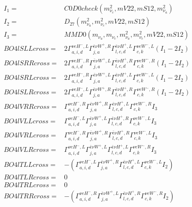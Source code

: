 \documentclass[A4,landscape]{article}
\begin{document}
\begin{align} 
I_1 = & C0D0check(m^2_{\nu_{{c}}}, mV22, mS12, m^2_{\nu_{{a}}}) \\ 
I_2 = & D_{27}(m^2_{\nu_{{a}}}, m^2_{\nu_{{c}}}, mV22, mS12) \\ 
I_3 = & MMD0(m_{\nu_{{a}}}, m_{\nu_{{c}}}, m^2_{\nu_{{a}}}, m^2_{\nu_{{c}}}, mV22, mS12) \\ 
  BO4lSLLcross= & 2  \Gamma^{\nu e H^- ,L}_{a, i, d} \Gamma^{\bar{e}\nu W^+ ,R}_{j, a} \Gamma^{\bar{e}\nu H^+,L}_{l, c, d} \Gamma^{\nu e W^-,L}_{c, k} (I_1 - 2 I_2) \\ 
  BO4lSRRcross= & 2  \Gamma^{\nu e H^- ,R}_{a, i, d} \Gamma^{\bar{e}\nu W^+ ,L}_{j, a} \Gamma^{\bar{e}\nu H^+,R}_{l, c, d} \Gamma^{\nu e W^-,R}_{c, k} (I_1 - 2 I_2) \\ 
  BO4lSRLcross= & 2  \Gamma^{\nu e H^- ,R}_{a, i, d} \Gamma^{\bar{e}\nu W^+ ,L}_{j, a} \Gamma^{\bar{e}\nu H^+,L}_{l, c, d} \Gamma^{\nu e W^-,L}_{c, k} (I_1 - 2 I_2) \\ 
  BO4lSLRcross= & 2  \Gamma^{\nu e H^- ,L}_{a, i, d} \Gamma^{\bar{e}\nu W^+ ,R}_{j, a} \Gamma^{\bar{e}\nu H^+,R}_{l, c, d} \Gamma^{\nu e W^-,R}_{c, k} (I_1 - 2 I_2) \\ 
  BO4lVRRcross= &  \Gamma^{\nu e H^- ,R}_{a, i, d} \Gamma^{\bar{e}\nu W^+ ,R}_{j, a} \Gamma^{\bar{e}\nu H^+,L}_{l, c, d} \Gamma^{\nu e W^-,R}_{c, k} I_3 \\ 
  BO4lVLLcross= &  \Gamma^{\nu e H^- ,L}_{a, i, d} \Gamma^{\bar{e}\nu W^+ ,L}_{j, a} \Gamma^{\bar{e}\nu H^+,R}_{l, c, d} \Gamma^{\nu e W^-,L}_{c, k} I_3 \\ 
  BO4lVRLcross= &  \Gamma^{\nu e H^- ,R}_{a, i, d} \Gamma^{\bar{e}\nu W^+ ,R}_{j, a} \Gamma^{\bar{e}\nu H^+,R}_{l, c, d} \Gamma^{\nu e W^-,L}_{c, k} I_3 \\ 
  BO4lVLRcross= &  \Gamma^{\nu e H^- ,L}_{a, i, d} \Gamma^{\bar{e}\nu W^+ ,L}_{j, a} \Gamma^{\bar{e}\nu H^+,L}_{l, c, d} \Gamma^{\nu e W^-,R}_{c, k} I_3 \\ 
  BO4lTLLcross= & -( \Gamma^{\nu e H^- ,L}_{a, i, d} \Gamma^{\bar{e}\nu W^+ ,R}_{j, a} \Gamma^{\bar{e}\nu H^+,L}_{l, c, d} \Gamma^{\nu e W^-,L}_{c, k} I_2) \\ 
  BO4lTLRcross= & 0 \\ 
  BO4lTRLcross= & 0 \\ 
  BO4lTRRcross= & -( \Gamma^{\nu e H^- ,R}_{a, i, d} \Gamma^{\bar{e}\nu W^+ ,L}_{j, a} \Gamma^{\bar{e}\nu H^+,R}_{l, c, d} \Gamma^{\nu e W^-,R}_{c, k} I_2) \\ 
\end{align} 
\end{document}
